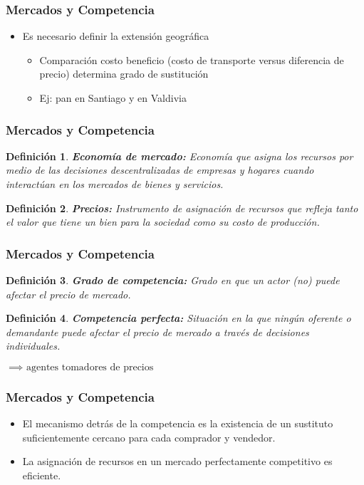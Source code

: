 \documentclass[dvipsnames,table]{beamer}
\newtheorem{mydef}{Definición}
\begin{document}
	\begin{frame}
			\frametitle{Mercados y Competencia}
			\begin{itemize}
				\item Es necesario definir la extensión geográfica
					\begin{itemize}
						\item Comparación costo beneficio (costo de transporte versus diferencia de precio) determina grado de sustitución
						\item Ej: pan en Santiago y en Valdivia 
					\end{itemize}
			\end{itemize}
		\end{frame}
		
		\begin{frame}
			\frametitle{Mercados y Competencia}
			\begin{mydef}
				\textbf{Economía de mercado:} Economía que asigna los recursos por medio de las decisiones descentralizadas de empresas y hogares cuando interactúan en los mercados de bienes y servicios.
			\end{mydef}
			\begin{mydef}
				\textbf{Precios:} Instrumento de asignación de recursos que refleja tanto el valor que tiene un bien para la sociedad como su costo de producción.
			\end{mydef}
		\end{frame}		
	
		\begin{frame}
			\frametitle{Mercados y Competencia}
			\begin{mydef}
				\textbf{Grado de competencia:} Grado en que un actor (no) puede afectar el precio de mercado.
			\end{mydef}
			\begin{mydef}
				\textbf{Competencia perfecta:} Situación en la que ningún oferente o demandante puede afectar el precio de mercado a través de decisiones individuales. 
				
				$\implies\text{ agentes tomadores de precios}$
			\end{mydef}
		\end{frame}				
	
		\begin{frame}
			\frametitle{Mercados y Competencia}
			\begin{itemize}
				\item El mecanismo detrás de la competencia es la existencia de un sustituto suficientemente cercano para cada comprador y vendedor.
				\item La asignación de recursos en un mercado perfectamente competitivo es eficiente.
			\end{itemize}
		\end{frame}
		
\end{document}
